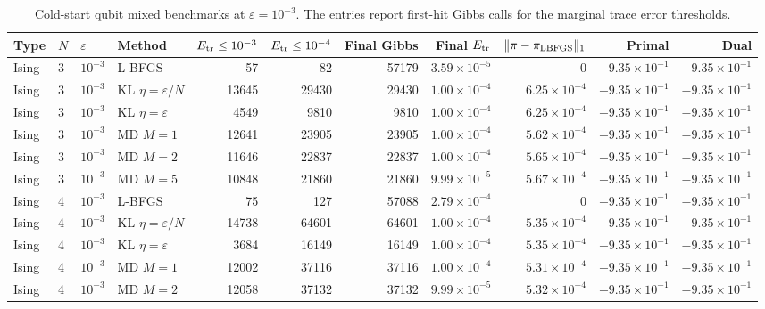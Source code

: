 \begin{table}[t]
\centering
\scriptsize
\caption{Cold-start qubit mixed benchmarks at $\varepsilon=10^{-3}$. The entries report first-hit Gibbs calls for the marginal trace error thresholds.}
\label{tab:qubit-scaling-N3N7-rerun}
\begin{tabular}{llllrrrrrrr}
\toprule
Type & $N$ & $\varepsilon$ & Method & $E_{\rm tr}\le10^{-3}$ & $E_{\rm tr}\le10^{-4}$ & Final Gibbs & Final $E_{\rm tr}$ & $\|\pi-\pi_{\rm LBFGS}\|_1$ & Primal & Dual \\
\midrule
Ising & 3 & $10^{-3}$ & L-BFGS & 57 & 82 & 57179 & $3.59\times 10^{-5}$ & 0 & $-9.35\times 10^{-1}$ & $-9.35\times 10^{-1}$ \\
Ising & 3 & $10^{-3}$ & KL $\eta=\varepsilon/N$ & 13645 & 29430 & 29430 & $1.00\times 10^{-4}$ & $6.25\times 10^{-4}$ & $-9.35\times 10^{-1}$ & $-9.35\times 10^{-1}$ \\
Ising & 3 & $10^{-3}$ & KL $\eta=\varepsilon$ & 4549 & 9810 & 9810 & $1.00\times 10^{-4}$ & $6.25\times 10^{-4}$ & $-9.35\times 10^{-1}$ & $-9.35\times 10^{-1}$ \\
Ising & 3 & $10^{-3}$ & MD $M=1$ & 12641 & 23905 & 23905 & $1.00\times 10^{-4}$ & $5.62\times 10^{-4}$ & $-9.35\times 10^{-1}$ & $-9.35\times 10^{-1}$ \\
Ising & 3 & $10^{-3}$ & MD $M=2$ & 11646 & 22837 & 22837 & $1.00\times 10^{-4}$ & $5.65\times 10^{-4}$ & $-9.35\times 10^{-1}$ & $-9.35\times 10^{-1}$ \\
Ising & 3 & $10^{-3}$ & MD $M=5$ & 10848 & 21860 & 21860 & $9.99\times 10^{-5}$ & $5.67\times 10^{-4}$ & $-9.35\times 10^{-1}$ & $-9.35\times 10^{-1}$ \\
\midrule
Ising & 4 & $10^{-3}$ & L-BFGS & 75 & 127 & 57088 & $2.79\times 10^{-4}$ & 0 & $-9.35\times 10^{-1}$ & $-9.35\times 10^{-1}$ \\
Ising & 4 & $10^{-3}$ & KL $\eta=\varepsilon/N$ & 14738 & 64601 & 64601 & $1.00\times 10^{-4}$ & $5.35\times 10^{-4}$ & $-9.35\times 10^{-1}$ & $-9.35\times 10^{-1}$ \\
Ising & 4 & $10^{-3}$ & KL $\eta=\varepsilon$ & 3684 & 16149 & 16149 & $1.00\times 10^{-4}$ & $5.35\times 10^{-4}$ & $-9.35\times 10^{-1}$ & $-9.35\times 10^{-1}$ \\
Ising & 4 & $10^{-3}$ & MD $M=1$ & 12002 & 37116 & 37116 & $1.00\times 10^{-4}$ & $5.31\times 10^{-4}$ & $-9.35\times 10^{-1}$ & $-9.35\times 10^{-1}$ \\
Ising & 4 & $10^{-3}$ & MD $M=2$ & 12058 & 37132 & 37132 & $9.99\times 10^{-5}$ & $5.32\times 10^{-4}$ & $-9.35\times 10^{-1}$ & $-9.35\times 10^{-1}$ \\

\end{tabular}
\end{table}
